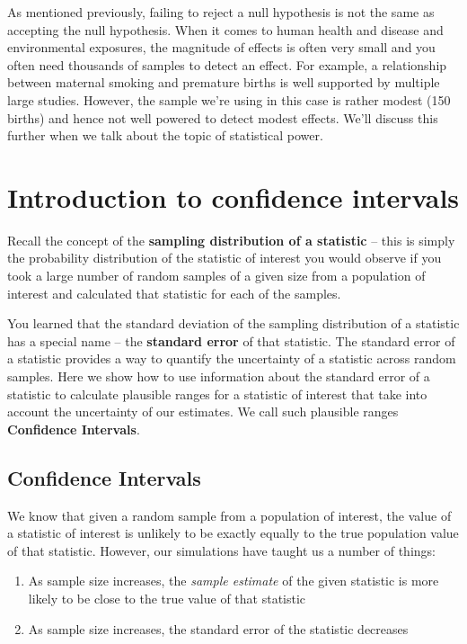 \documentclass[]{book}
\theoremstyle{definition}
\theoremstyle{definition}
\theoremstyle{definition}
\theoremstyle{remark}
\begin{document}
As mentioned previously, failing to reject a null hypothesis is not the
same as accepting the null hypothesis. When it comes to human health and
disease and environmental exposures, the magnitude of effects is often
very small and you often need thousands of samples to detect an effect.
For example, a relationship between maternal smoking and premature
births is well supported by multiple large studies. However, the sample
we're using in this case is rather modest (150 births) and hence not
well powered to detect modest effects. We'll discuss this further when
we talk about the topic of statistical power.

\hypertarget{introduction-to-confidence-intervals}{%
\chapter{Introduction to confidence
intervals}\label{introduction-to-confidence-intervals}}

Recall the concept of the \textbf{sampling distribution of a statistic}
-- this is simply the probability distribution of the statistic of
interest you would observe if you took a large number of random samples
of a given size from a population of interest and calculated that
statistic for each of the samples.

You learned that the standard deviation of the sampling distribution of
a statistic has a special name -- the \textbf{standard error} of that
statistic. The standard error of a statistic provides a way to quantify
the uncertainty of a statistic across random samples. Here we show how
to use information about the standard error of a statistic to calculate
plausible ranges for a statistic of interest that take into account the
uncertainty of our estimates. We call such plausible ranges
\textbf{Confidence Intervals}.

\hypertarget{confidence-intervals}{%
\section{Confidence Intervals}\label{confidence-intervals}}

We know that given a random sample from a population of interest, the
value of a statistic of interest is unlikely to be exactly equally to
the true population value of that statistic. However, our simulations
have taught us a number of things:

\begin{enumerate}
\def\labelenumi{\arabic{enumi}.}
\item
  As sample size increases, the \emph{sample estimate} of the given
  statistic is more likely to be close to the true value of that
  statistic
\item
  As sample size increases, the standard error of the statistic
  decreases
\end{enumerate}
\end{document}
